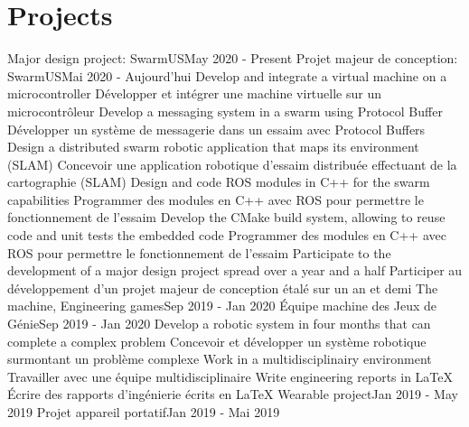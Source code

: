 \documentclass[letterpaper,11pt]{resume}
\begin{document}
\section{Projects}
    \resumeSubHeadingListStart
      \resumeProjectHeadingEnFr
          {Major design project: SwarmUS}{May 2020 - Present}
          {Projet majeur de conception: SwarmUS}{Mai 2020 - Aujourd'hui}
          \resumeItemListStart
            \resumeItemEnFr
                {Develop and integrate a virtual machine on a microcontroller}
                {Développer et intégrer une machine virtuelle sur un microcontrôleur}
            \resumeItemEnFr
                {Develop a messaging system in a swarm using Protocol Buffer}
                {Développer un système de messagerie dans un essaim avec Protocol Buffers}
            \resumeItemEnFr
                {Design a distributed swarm robotic application that maps its environment (SLAM)}
                {Concevoir une application robotique d’essaim distribuée effectuant de la cartographie (SLAM)}
            \resumeItemEnFr
                {Design and code ROS modules in C++ for the swarm capabilities}
                {Programmer des modules en C++ avec ROS pour permettre le fonctionnement de l’essaim}
            \resumeItemEnFr
                {Develop the CMake build system, allowing to reuse code and unit tests the embedded code}
                {Programmer des modules en C++ avec ROS pour permettre le fonctionnement de l’essaim}
            \resumeItemEnFr
                {Participate to the development of a major design project spread over a year and a half}
                {Participer au développement d’un projet majeur de conception étalé sur un an et demi}
          \resumeItemListEnd
      \resumeProjectHeadingEnFr
          {The machine, Engineering games}{Sep 2019 - Jan 2020}
          {Équipe machine des Jeux de Génie}{Sep 2019 - Jan 2020}
          \resumeItemListStart
            \resumeItemEnFr
                {Develop a robotic system in four months that can complete a complex problem}
                {Concevoir et développer un système robotique surmontant un problème complexe}
            \resumeItemEnFr
                {Work in a multidisciplinairy environment}
                {Travailler avec une équipe multidisciplinaire}
            \resumeItemEnFr
                {Write engineering reports in LaTeX}
                {Écrire des rapports d’ingénierie écrits en LaTeX}
          \resumeItemListEnd
      \resumeProjectHeadingEnFr
          {Wearable project}{Jan 2019 - May 2019}
          {Projet appareil portatif}{Jan 2019 - Mai 2019}
\end{document}
